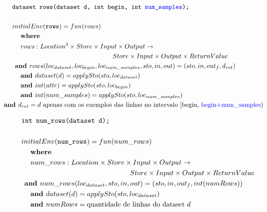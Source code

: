 \documentclass[12pt]{article}
\newcommand{\blu}{\textcolor{blue}}
\begin{document}
\begin{align*}
	&\texttt{dataset rows(dataset d, int begin, int \blu{num\_samples});} \\
	\\
	&initialEnv(\texttt{rows}) = fun(rows) \\
	&\hspace{3ex}\textbf{where } \\
	&\hspace{3ex} rows:Location^3\times Store\times Input\times Output\rightarrow \\
	&\hspace{36ex}Store\times Input\times Output\times ReturnValue \\
	&\hspace{1ex}\textbf{and } rows(loc_{dataset}, loc_{begin}, loc_{num\_samples},sto,in,out) = (sto,in,out_f,d_{ret})\\
	&\hspace{3ex}\textbf{and } dataset(d) = applySto(sto, loc_{dataset}) \\
	&\hspace{3ex}\textbf{and } int(attr) = applySto(sto, loc_{begin}) \\
	&\hspace{3ex}\textbf{and } int(num\_samples) = applySto(sto, loc_{num\_samples}) \\
	&\hspace{-3ex}\textbf{and } d_{ret} = d\text{ apenas com os exemplos das linhas no intervalo [begin, \blu{begin+num\_samples})} \\
\end{align*}


\begin{align*}
	&\texttt{int num\_rows(dataset d);} \\
	\\
	&initialEnv(\texttt{num\_rows}) = fun(num\_rows) \\
	&\hspace{3ex}\textbf{where } \\
	&\hspace{3ex} num\_rows:Location\times Store\times Input\times Output\rightarrow \\
	&\hspace{36ex}Store\times Input\times Output\times ReturnValue \\
	&\hspace{1ex}\textbf{and } num\_rows(loc_{dataset},sto,in,out) = (sto,in,out_f,int(numRows))\\
	&\hspace{3ex}\textbf{and } dataset(d) = applySto(sto, loc_{dataset}) \\
	&\hspace{3ex}\textbf{and } numRows = \text{quantidade de linhas do dataset }d \\
\end{align*}
\end{document}
